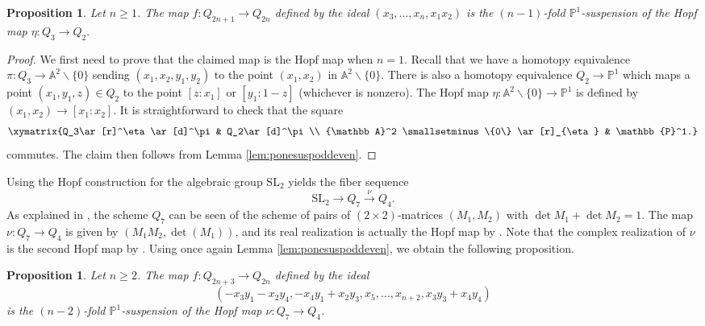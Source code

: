 \documentclass[11pt,leqno]{article}
\newcommand{\A}{{\mathbb A}}
\newcommand{\pone}{{\mathbb P}^1}
\renewcommand{\1}{{\rm 1\hspace*{-0.4ex}%
\rule{0.1ex}{1.52ex}\hspace*{0.2ex}}}
\newcommand{\<}[1]{{\langle}#1 {\rangle}}
\theoremstyle{plain}
\newtheorem{prop}[thm]{Proposition}
\theoremstyle{definition}
\theoremstyle{remark}
\numberwithin{equation}{section}
\begin{document}
\begin{prop}
\label{prop:etasusp}
Let $n\geq 1$. The map $f\colon Q_{2n+1} \to Q_{2n}$ defined by the ideal $(x_3, \ldots, x_n, x_1x_2)$ is the $(n-1)$-fold $\mathbb{P}^1$-suspension of the Hopf map $\eta \colon Q_3 \to Q_2.$


\end{prop}
\begin{proof}
We first need to prove that the claimed map is the Hopf map when $n=1$. Recall that we have a homotopy equivalence $\pi \colon Q_3 \to \A^2 \smallsetminus\{0\}$ sending $(x_1,x_2,y_1,y_2)$ to the point $(x_1,x_2)$ in $\A^2 \smallsetminus\{0\}$. There is also a homotopy equivalence $Q_2 \to \pone$ which maps a point $(x_1,y_1,z) \in Q_2$ to the point $[z:x_1]$ or $[y_1 : 1-z]$ (whichever is nonzero). The Hopf map $\eta\colon \A^2 \smallsetminus\{0\} \to \pone$ is defined by $(x_1,x_2) \to [x_1:x_2]$. It is straightforward to check that the square 
\begin{equation*}
    \xymatrix{Q_3\ar[r]^\eta\ar[d]^\pi & Q_2\ar[d]^\pi \\
\A^2 \smallsetminus\{0\} \ar[r]_{\eta} & \mathbb{P}^1.}
\end{equation*}
commutes. The claim then follows from Lemma \ref{lem:ponesuspoddeven}.

\end{proof}
Using the Hopf construction for the algebraic group $\mathrm{SL}_2$ yields the fiber sequence
\begin{equation*}
    \mathrm{SL_2} \to Q_7 \xrightarrow{\nu} Q_4. 
\end{equation*}
As explained in \cite[\S3]{Fasel16a}, the scheme $Q_7$ can be seen of the scheme of pairs of $(2\times 2)$-matrices $(M_1,M_2)$ with $\det M_1 + \det M_2 = 1$. The map $\nu\colon Q_7 \to Q_4$ is given by $(M_1 M_2, \det(M_1))$, and its real realization is actually the Hopf map by \cite[Proposition 3.0.1]{Fasel16a}. Note that the complex realization of $\nu$ is the second Hopf map by \cite{Gluck86}. Using once again Lemma \ref{lem:ponesuspoddeven}, we obtain the following proposition.

\begin{prop}\label{prop:nususp}
Let $n\geq 2$. The map $f\colon Q_{2n+3} \to Q_{2n}$ defined by the ideal 
\begin{equation*}
    (-x_3y_1-x_2y_4,-x_4y_1+x_2y_3, x_5, \ldots, x_{n+2}, x_3y_3 + x_4y_4)
\end{equation*} 
is the $(n-2)$-fold $\mathbb{P}^1$-suspension of the Hopf map $\nu \colon Q_7 \to Q_4$.
\end{prop}
\end{document}
